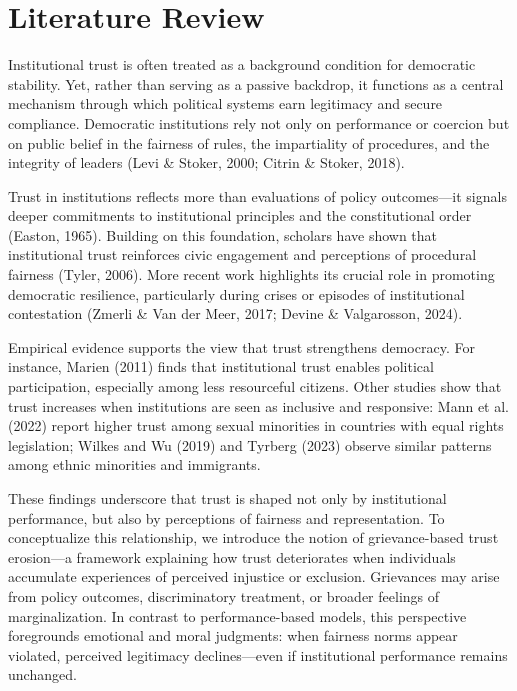 \documentclass{article}
\begin{document}
\section{Literature Review}

Institutional trust is often treated as a background condition for democratic stability. Yet, rather than serving as a passive backdrop, it functions as a central mechanism through which political systems earn legitimacy and secure compliance. Democratic institutions rely not only on performance or coercion but on public belief in the fairness of rules, the impartiality of procedures, and the integrity of leaders (Levi \& Stoker, 2000; Citrin \& Stoker, 2018).

Trust in institutions reflects more than evaluations of policy outcomes—it signals deeper commitments to institutional principles and the constitutional order (Easton, 1965). Building on this foundation, scholars have shown that institutional trust reinforces civic engagement and perceptions of procedural fairness (Tyler, 2006). More recent work highlights its crucial role in promoting democratic resilience, particularly during crises or episodes of institutional contestation (Zmerli \& Van der Meer, 2017; Devine \& Valgarosson, 2024).

Empirical evidence supports the view that trust strengthens democracy. For instance, Marien (2011) finds that institutional trust enables political participation, especially among less resourceful citizens. Other studies show that trust increases when institutions are seen as inclusive and responsive: Mann et al. (2022) report higher trust among sexual minorities in countries with equal rights legislation; Wilkes and Wu (2019) and Tyrberg (2023) observe similar patterns among ethnic minorities and immigrants.

These findings underscore that trust is shaped not only by institutional performance, but also by perceptions of fairness and representation. To conceptualize this relationship, we introduce the notion of grievance-based trust erosion—a framework explaining how trust deteriorates when individuals accumulate experiences of perceived injustice or exclusion. Grievances may arise from policy outcomes, discriminatory treatment, or broader feelings of marginalization. In contrast to performance-based models, this perspective foregrounds emotional and moral judgments: when fairness norms appear violated, perceived legitimacy declines—even if institutional performance remains unchanged.
\end{document}
